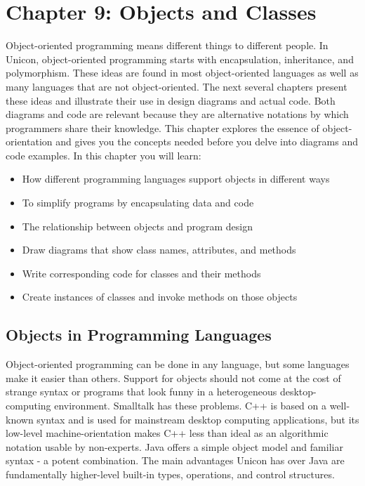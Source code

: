 \clearpage\section{Chapter 9: Objects and Classes}

Object-oriented programming means
different things to different people. In Unicon, object-oriented
programming starts with encapsulation, inheritance, and polymorphism.
These ideas are found in most object-oriented languages as well as many
languages that are not object-oriented. The next several chapters
present these ideas and illustrate their use in design diagrams and
actual code. Both diagrams and code are relevant because they are
alternative notations by which programmers share their knowledge. This
chapter explores the essence of object-orientation and gives you the
concepts needed before you delve into diagrams and code examples. In
this chapter you will learn:

\begin{itemize}
\item How different programming languages support objects in different
ways
\item To simplify programs by encapsulating data and code
\item The relationship between objects and program design
\item Draw diagrams that show class names, attributes, and methods
\item Write corresponding code for classes and their methods
\item Create instances of classes and invoke methods on those objects
\end{itemize}

\subsection{Objects in Programming Languages}

Object-oriented programming can be done in any language, but some
languages make it easier than others. Support for objects should not
come at the cost of strange syntax or programs that look funny in a
heterogeneous desktop-computing environment. Smalltalk
has these problems. C++ is based on a well-known syntax and is used for
mainstream desktop computing applications, but its low-level
machine-orientation makes C++ less than ideal as an algorithmic
notation usable by non-experts. Java offers a simple object
model and familiar syntax - a potent combination. The main advantages
Unicon has over Java are fundamentally higher-level built-in types,
operations, and control structures.

